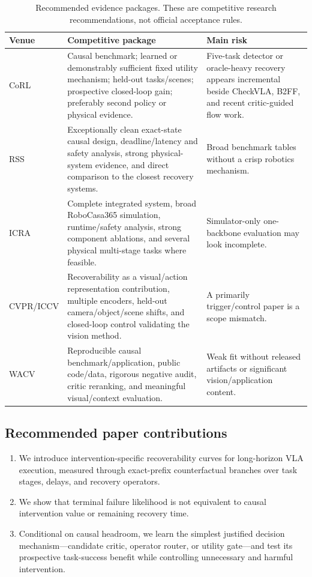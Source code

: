 \begin{table}[H]
\centering
\caption{Recommended evidence packages. These are competitive research recommendations, not official acceptance rules.}
\label{tab:venues}
\small
\begin{tabularx}{\textwidth}{P{0.13\textwidth}Y P{0.28\textwidth}}
\toprule
Venue & Competitive package & Main risk \\
\midrule
CoRL & Causal benchmark; learned or demonstrably sufficient fixed utility mechanism; held-out tasks/scenes; prospective closed-loop gain; preferably second policy or physical evidence. & Five-task detector or oracle-heavy recovery appears incremental beside CheckVLA, B2FF, and recent critic-guided flow work. \\
RSS & Exceptionally clean exact-state causal design, deadline/latency and safety analysis, strong physical-system evidence, and direct comparison to the closest recovery systems. & Broad benchmark tables without a crisp robotics mechanism. \\
ICRA & Complete integrated system, broad RoboCasa365 simulation, runtime/safety analysis, strong component ablations, and several physical multi-stage tasks where feasible. & Simulator-only one-backbone evaluation may look incomplete. \\
CVPR/ICCV & Recoverability as a visual/action representation contribution, multiple encoders, held-out camera/object/scene shifts, and closed-loop control validating the vision method. & A primarily trigger/control paper is a scope mismatch. \\
WACV & Reproducible causal benchmark/application, public code/data, rigorous negative audit, critic reranking, and meaningful visual/context evaluation. & Weak fit without released artifacts or significant vision/application content. \\
\bottomrule
\end{tabularx}
\end{table}

\subsection{Recommended paper contributions}

\begin{enumerate}
  \item We introduce intervention-specific recoverability curves for long-horizon VLA execution, measured through exact-prefix counterfactual branches over task stages, delays, and recovery operators.
  \item We show that terminal failure likelihood is not equivalent to causal intervention value or remaining recovery time.
  \item Conditional on causal headroom, we learn the simplest justified decision mechanism---candidate critic, operator router, or utility gate---and test its prospective task-success benefit while controlling unnecessary and harmful intervention.
\end{enumerate}

